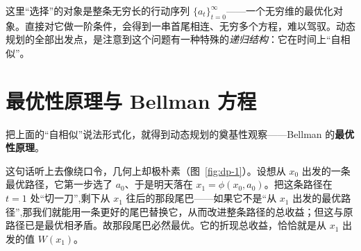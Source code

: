 这里``选择''的对象是整条无穷长的行动序列 $\{a_t\}_{t=0}^{\infty}$——一个无穷维的最优化对象。直接对它做一阶条件，会得到一串首尾相连、无穷多个方程，难以驾驭。动态规划的全部出发点，是注意到这个问题有一种特殊的\emph{递归结构}：它在时间上``自相似''。


\section{最优性原理与 Bellman 方程}
\label{sec:dp-bellman}

把上面的``自相似''说法形式化，就得到动态规划的奠基性观察——Bellman 的\textbf{最优性原理}。


这句话听上去像绕口令，几何上却极朴素（图~\ref{fig:dp-1}）。设想从 $x_0$ 出发的一条最优路径，它第一步选了 $a_0$、于是明天落在 $x_1=\phi(x_0,a_0)$。把这条路径在 $t=1$ 处``切一刀'',剩下从 $x_1$ 往后的那段尾巴——如果它不是``从 $x_1$ 出发的最优路径'',那我们就能用一条更好的尾巴替换它，从而改进整条路径的总收益；但这与原路径已是最优相矛盾。故那段尾巴必然最优。它的折现总收益，恰恰就是从 $x_1$ 出发的值 $W(x_1)$。

